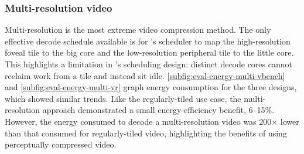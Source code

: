 \subsubsection{Multi-resolution video}
Multi-resolution is the most extreme video compression method.
The only effective decode schedule available is for \nameArch's scheduler to map the high-resolution foveal tile to the big core and the low-resolution peripheral tile to the little core.
This highlights a limitation in \nameArch's scheduling design: distinct decode cores cannot reclaim work from a tile and instead sit idle.
\ref{subfig:eval-energy-multi-vbench} and \ref{subfig:eval-energy-multi-vr} graph energy consumption for the three designs, which showed similar trends.
Like the regularly-tiled use case, the multi-resolution approach demonstrated a small energy-efficiency benefit, 6--15\%.
However, the energy consumed to decode a multi-resolution video was 200$\times$ lower than that consumed for regularly-tiled video, highlighting the benefits of using perceptually compressed video.
